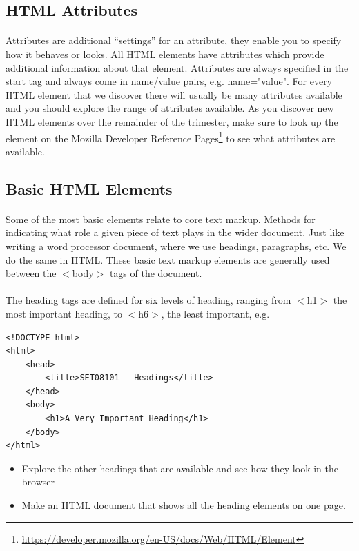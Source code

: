 \documentclass[10pt, a4paper, twosize]{article}
\begin{document}
\subsection{HTML Attributes}
\paragraph{} Attributes are additional ``settings'' for an attribute, they enable you to specify how it behaves or looks. All HTML elements have attributes which provide additional information about that element. Attributes are always specified in the start tag and always come in name/value pairs, e.g. name="value". For every HTML element that we discover there will usually be many attributes available and you should explore the range of attributes available. As you discover new HTML elements over the remainder of the trimester, make sure to look up the element on the Mozilla Developer Reference Pages\footnote{\url{https://developer.mozilla.org/en-US/docs/Web/HTML/Element}} to see what attributes are available.

\subsection{Basic HTML Elements}
\paragraph{} Some of the most basic elements relate to core text markup. Methods for indicating what role a given piece of text plays in the wider document. Just like writing a word processor document, where we use headings, paragraphs, etc. We do the same in HTML. These basic text markup elements are generally used between the $<$body$>$ tags of the document.

\paragraph{} The heading tags are defined for six levels of heading, ranging from $<$h1$>$ the most important heading, to $<$h6$>$, the least important, e.g.

\begin{lstlisting}
<!DOCTYPE html>
<html>
    <head>
        <title>SET08101 - Headings</title>
    </head>
    <body>
        <h1>A Very Important Heading</h1>      
    </body>
</html>
\end{lstlisting}

\begin{itemize}
\item Explore the other headings that are available and see how they look in the browser
\item Make an HTML document that shows all the heading elements on one page.
\end{itemize}
\end{document}
